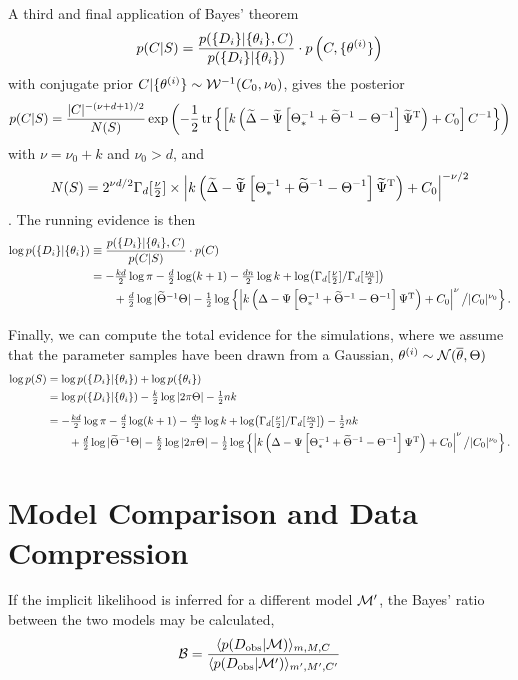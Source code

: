 \documentclass[%
 reprint,
 amsmath,amssymb,
 aps,
]{revtex4-2}
\begin{document}
\begin{widetext}
\noindent A third and final application of Bayes' theorem
$$
	p(C|S) = \frac{p(\{D_i\}|\{\theta_i\},C)}{p(\{D_i\}|\{\theta_i\})}\cdot p\left( C,\{\theta^{(i)}\} \right)
$$
with conjugate prior $C|\{\theta^{(i)}\}  \sim  \mathcal{W}^{-1}(C_0,\nu_0)$, gives the posterior
\begin{equation}
	p(C|S) =\frac{|C|^{-(\nu+d +1)/2}}{N(S)}
			\exp\left( -\frac{1}{2}\tr\left\{ \left[ k\left( \widetilde\Delta -  \widetilde\Psi \left[ \Theta_*^{-1}+\widetilde\Theta^{-1}- \Theta^{-1} \right]\widetilde\Psi^{\mathrm{T}} \right)+C_0 \right]C^{-1} \right\} \right)
\end{equation}
with $\nu = \nu_0 + k$ and $\nu_0>d$, and
\begin{equation*}
	N(S)= 2^{\nu d/2}  \Gamma_d[\tfrac{\nu}{2}]\times\left|k\left( \widetilde\Delta -  \widetilde\Psi \left[ \Theta_*^{-1}+\widetilde\Theta^{-1}- \Theta^{-1} \right]\widetilde\Psi^{\mathrm{T}} \right)+C_0\right|^{-\nu/2}
\end{equation*}
. The running evidence is then
\begin{align*}
	\log p(\{D_i\}|\{\theta_i\}) &\equiv  \frac{p(\{D_i\}|\{\theta_i\},C)}{p(C|S)}\cdot p(C) \\
	&=-\tfrac{kd}{2}\log \pi -\tfrac{d}{2}\log(k+1) -\tfrac{dn}{2}\log k+\log(\Gamma_d[\tfrac{\nu}{2}]/\Gamma_d[\tfrac{\nu_0}{2}])\\
		&\qquad \textstyle 
			+\tfrac{d}{2}\log|\widetilde\Theta^{-1}\Theta|-\tfrac{1}{2}\log\left\{ \left|k\left( \Delta -  \Psi \left[ \Theta_*^{-1}+\widetilde\Theta^{-1}- \Theta^{-1} \right]\Psi^{\mathrm{T}} \right)+C_0\right|^\nu\big/|C_0|^{\nu_0} \right\}.
\end{align*}

Finally, we can compute the total evidence for the simulations, where we assume that the parameter samples have been drawn from a Gaussian, $\theta^{(i)}\sim\mathcal{N}(\overline{\theta}, \Theta)$
\begin{align*}
	\log p(S) &= \log p(\{D_i\}|\{\theta_i\}) + \log p(\{\theta_i\})\\
	&=  \log p(\{D_i\}|\{\theta_i\}) - \tfrac{k}{2}\log|2\pi\Theta|-\tfrac{1}{2}nk\\[2mm]
	&=-\tfrac{kd}{2}\log \pi -\tfrac{d}{2}\log(k+1) -\tfrac{dn}{2}\log k+\log(\Gamma_d[\tfrac{\nu}{2}]/\Gamma_d[\tfrac{\nu_0}{2}])-\tfrac{1}{2}nk\\
		&\qquad \textstyle 
			+\tfrac{d}{2}\log|\widetilde\Theta^{-1}\Theta|- \tfrac{k}{2}\log|2\pi\Theta|-\tfrac{1}{2}\log\left\{ \left|k\left( \Delta -  \Psi \left[ \Theta_*^{-1}+\widetilde\Theta^{-1}- \Theta^{-1} \right]\Psi^{\mathrm{T}} \right)+C_0\right|^\nu\big/|C_0|^{\nu_0} \right\}.
\end{align*}




\section{Model Comparison and Data Compression} \label{ap:C}
If the implicit likelihood is inferred  for a different model $\mathcal{M}'$, the Bayes' ratio between the two models may be calculated,
\begin{equation}
	\mathcal{B} = \frac{\langle p(D_\text{obs}|\mathcal{M})\rangle_{m,M,C}}{\langle p(D_\text{obs}|\mathcal{M}')\rangle_{m',M',C'}}
\end{equation}


\end{widetext}
\end{document}
